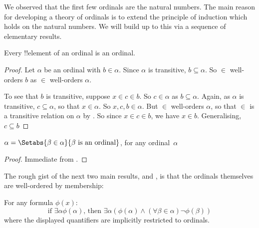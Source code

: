 \documentclass[../../../include/open-logic-section]{subfiles}
\begin{document}

We observed that the first few ordinals are the natural numbers. The
main reason for developing a theory of ordinals is to extend the
principle of induction which holds on the natural numbers. We will
build up to this via a sequence of elementary results.

\begin{lem}
Every !!{element} of an ordinal is an ordinal.
\end{lem}

\begin{proof}
Let $\alpha$ be an ordinal with $b \in \alpha$. Since $\alpha$ is
transitive, $b \subseteq \alpha$. So $\in$ well-orders $b$ as $\in$
well-orders $\alpha$.

To see that $b$ is transitive, suppose $x \in c \in b$. So $c \in \alpha$ as $b
\subseteq \alpha$. Again, as $\alpha$ is transitive, $c \subseteq
\alpha$, so that $x \in \alpha$. So $x, c, b \in \alpha$. But $\in$
well-orders $\alpha$, so that $\in$ is a transitive relation on
$\alpha$ by . So since $x
\in c \in b$, we have $x \in b$. Generalising, $c \subseteq b$
\end{proof}

\begin{cor}
$\alpha = \Setabs{\beta \in \alpha}{\beta \text{ is an ordinal}}$, for
any ordinal~$\alpha$
\end{cor}

\begin{proof}
Immediate from .
\end{proof}

The rough gist of the next two main results,
 and , is that the
ordinals themselves are well-ordered by membership:

\begin{thm}
For any formula $\phi(x)$: 	
\[
	\text{if }\exists \alpha \phi(\alpha)\text{, then }\exists \alpha(\phi(\alpha)
	\land  (\forall \beta \in \alpha) \lnot \phi(\beta))
\]
where the displayed quantifiers are implicitly restricted to ordinals.
\end{thm}
\end{document}
